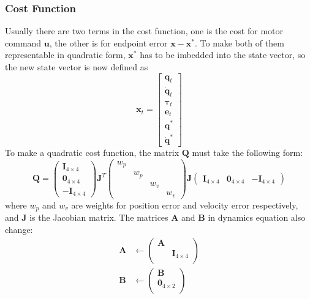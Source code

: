 \subsubsection{Cost Function}
\label{app:cost}
Usually there are two terms in the cost function, one is the cost for motor command $\bm{u}$, the other is for endpoint error $\bm{x} - \bm{x}^*$. To make both of them representable in quadratic form, $\bm{x}^*$ has to be imbedded into the state vector, so the new state vector is now defined as
\begin{equation}
\bm{x}_t=\left[ \begin{matrix}\bm{q}_t \\ \dot{\bm{q}}_t \\ \bm{\tau}_t \\ \bm{e}_t \\
\bm{q}^* \\ \dot{\bm{q}}^*
\end{matrix} \right]
\end{equation}
To make a quadratic cost function, the matrix $\bm{Q}$ must take the following form:
\begin{equation}
\bm{Q} = 
\left( \begin{matrix}
\bm{I}_{4\times4} \\
\bm{0}_{4\times4} \\
\bm{-I}_{4\times4} 
\end{matrix} \right)
\bm{J}^T
\left( \begin{matrix}
w_p &&&\\
&w_p&& \\
&&w_v&\\
&&&w_v 
\end{matrix} \right)
\bm{J}
\left( \begin{matrix}
\bm{I}_{4\times4} &
\bm{0}_{4\times4} &
\bm{-I}_{4\times4} 
\end{matrix} \right)
\end{equation}
where $w_p$ and $w_v$ are weights for position error and velocity error respectively, and $\bm{J}$ is the Jacobian matrix. The matrices $\bm{A}$ and $\bm{B}$ in dynamics equation also change:
\begin{equation}
\begin{split}
\bm{A} & \leftarrow \left( \begin{matrix}
\bm{A} \\
&\bm{I}_{4\times4} \\
\end{matrix} \right) \\
\bm{B} & \leftarrow \left( \begin{matrix}
\bm{B} \\
\bm{0}_{4\times2} \\
\end{matrix} \right)
\end{split}
\end{equation}
